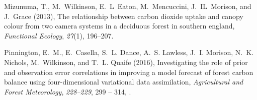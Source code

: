 \documentclass[draft,jgrga]{agutexSI}
\begin{document}
\begin{article}
\begin{thebibliography}{2}
Mizunuma, T., M.~Wilkinson, E.~L~Eaton, M.~Mencuccini, J.~IL~Morison, and
  J.~Grace (2013), The relationship between carbon dioxide uptake and canopy
  colour from two camera systems in a deciduous forest in southern england,
  \textit{Functional Ecology}, \textit{27}(1), 196--207.

Pinnington, E.~M., E.~Casella, S.~L. Dance, A.~S. Lawless, J.~I. Morison, N.~K.
  Nichols, M.~Wilkinson, and T.~L. Quaife (2016), Investigating the role of
  prior and observation error correlations in improving a model forecast of
  forest carbon balance using four-dimensional variational data assimilation,
  \textit{Agricultural and Forest Meteorology}, \textit{228--229}, 299 -- 314,
  .

\end{thebibliography}

%
%
%
%


%
%
%
%


\end{article}
\end{document}
